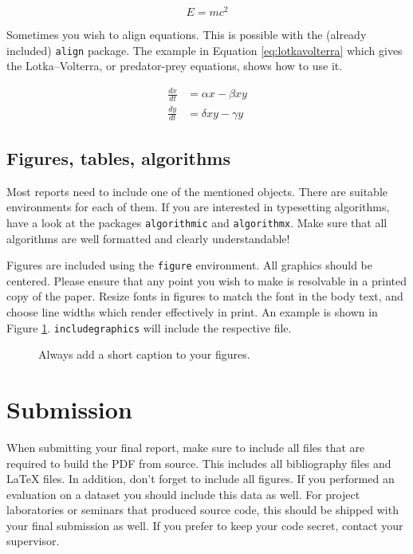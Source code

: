 \documentclass[10pt,a4paper,twoside,journal]{IEEEtran}
\begin{document}
\begin{equation}
	E = mc^2
\end{equation}

Sometimes you wish to align equations. This is possible with the (already
included) \texttt{align} package. The example in Equation \ref{eq:lotkavolterra}
which gives the Lotka--Volterra, or predator-prey equations, shows how to use
it.

\begin{align}\label{eq:lotkavolterra}
	\frac{dx}{dt} &= \alpha x - \beta x y \\
	\frac{dy}{dt} &= \delta x y - \gamma y
\end{align}

\subsection{Figures, tables, algorithms}

Most reports need to include one of the mentioned objects. There are suitable
environments for each of them. If you are interested in typesetting algorithms,
have a look at the packages \texttt{algorithmic} and \texttt{algorithmx}. Make
sure that all algorithms are well formatted and clearly understandable!

Figures are included using the \texttt{figure} environment. All graphics should
be centered.  Please ensure that any point you wish to make is resolvable in a
printed copy of the paper. Resize fonts in figures to match the font in the
body text, and choose line widths which render effectively in print. An example
is shown in Figure \ref{fig:onecolumnfigure}.
\texttt{includegraphics} will include the respective file.
\begin{figure}
	\centering
	\fbox{\rule{0pt}{2cm} \rule{1.0\linewidth}{0pt}}
	\caption{Always add a short caption to your figures.}
	\label{fig:onecolumnfigure}
\end{figure}


\section{Submission}

When submitting your final report, make sure to include all files that are
required to build the PDF from source. This includes all bibliography files and
\LaTeX{} files. In addition, don't forget to include all figures. If you
performed an evaluation on a dataset you should include this data as well. For
project laboratories or seminars that produced source code, this should be
shipped with your final submission as well. If you prefer to keep your code
secret, contact your supervisor.
\end{document}
